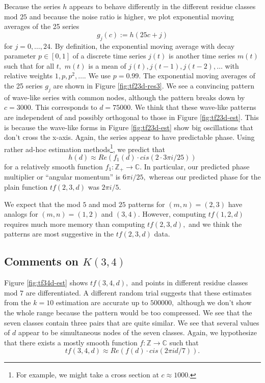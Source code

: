 \documentclass[11pt]{amsart} %
\begin{document}
Because the series $h$ appears to behave differently in the different residue classes $\text{mod}$ $25$ and because the noise ratio is higher, we plot exponential moving averages of the 25 series  
\[g_j(c):= h(25 c + j)\] for $j = 0, \ldots, 24.$ By definition, the exponential moving average with decay parameter $p \in [0,1]$  of a discrete time series $j(t)$ is another time series $m(t)$ such that for all $t,$ $m(t)$ is a mean of $j(t), j(t-1), j(t-2), \ldots$ with relative weights $1, p, p^2, \ldots$. We use $p = 0.99.$ The exponential moving averages of the 25 series $g_j$ are shown in Figure \ref{fig:tf23d-res3}. We see a convincing pattern of wave-like series with common nodes, although the pattern breaks down by $c = 3000.$ This corresponds to $d = 75000.$  We think that these wave-like patterns are independent of and possibly orthogonal to those in Figure \ref{fig:tf23d-est}. This is because the wave-like forms in Figure \ref{fig:tf23d-est} show big oscillations that don't cross the x-axis. Again, the series appear to have predictable phase. Using rather ad-hoc estimation methods\footnote{For example, we might take a cross section at $c \approx 1000.$}, we predict that 
\[ h(d) \approx Re(f_1(d) \cdot cis(2 \cdot 3 \pi i / 25))\]
for a relatively smooth function $f_1: \mathbb{Z}_+ \rightarrow \mathbb{C}.$ In particular, our predicted phase multiplier  or ``angular momentum'' is $6 \pi i / 25,$ whereas our predicted phase for the plain function $tf(2,3,d)$ was $2 \pi i / 5.$


We expect that the mod $5$ and mod $25$ patterns for $(m,n)=(2,3)$ have analogs for $(m,n)=(1,2)$ and $(3,4).$ However, computing $tf(1,2,d)$ requires much more memory than computing $tf(2,3,d),$ and we think the patterns are most suggestive in the $tf(2,3,d)$ data.

\subsection{Comments on $K(3,4)$}
Figure \ref{fig:tf34d-est} shows $tf(3,4,d),$ and points in different residue classes $\text{mod 7}$ are differentiated. A different random trial suggests that these estimates from the $k=10$ estimation are accurate up to $500000,$ although we don't show the whole range because the pattern would be too compressed. We see that the seven classes contain three pairs that are quite similar. We see that several values of $d$ appear to be simultaneous nodes of the seven classes. Again, we hypothesize that there exists a mostly smooth function $f: \mathbb{Z} \rightarrow \mathbb{C}$ such that
\[ tf(3,4,d) \approx Re( f(d) \cdot cis(2 \pi i d / 7)).\]
\end{document}
